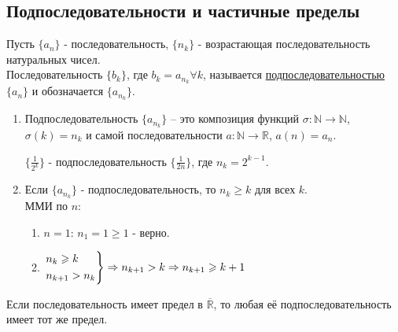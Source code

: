 \subsection{Подпоследовательности и частичные пределы}
    \begin{definition}
        Пусть $\{a_{n}\}$ - последовательность, $\{n_{k}\}$ - возрастающая последовательность натуральных чисел.\\
        Последовательность $\{b_{k}\}$, где $b_{k} = a_{n_{k}} \forall k$, называется \underline{подпоследовательностью} $\{a_{n}\}$ и обозначается $\{a_{n_{k}}\}$.
    \end{definition}

    \begin{note}
        \begin{enumerate}
            \item Подпоследовательность $\{a_{n_{k}}\}$ -- это композиция функций $\sigma: \mathds{N} \to \mathds{N}$, $\sigma(k) = n_{k}$ и самой последовательности $a: \mathds{N} \to \mathds{R}$, $a(n) = a_{n}$.
            \begin{example}
                $\{\frac{1}{2^{k}}\}$ - подпоследовательность $\{\frac{1}{2n}\}$, где $n_{k} = 2^{k-1}$.
            \end{example}
            \item Если $\{a_{n_{k}}\}$ - подпоследовательность, то $n_{k} \geq k$ для всех $k$.\\
                ММИ по $n$:\\
                \begin{enumerate}
                    \item $n = 1$: $n_1 = 1 \geq 1$ - верно.\\
                    \item 
                    $\begin{rcases}
                        n_{k} \geq k\\
                        n_{k+1} > n_{k}\\
                    \end{rcases}
                    \Rightarrow n_{k+1} > k \Rightarrow n_{k+1} \geq k+1$
                \end{enumerate}
        \end{enumerate}
    \end{note}

    \begin{lemma}
        Если последовательность имеет предел в $\overline{\mathds{R}}$, то любая её подпоследовательность имеет тот же предел.
    \end{lemma}

